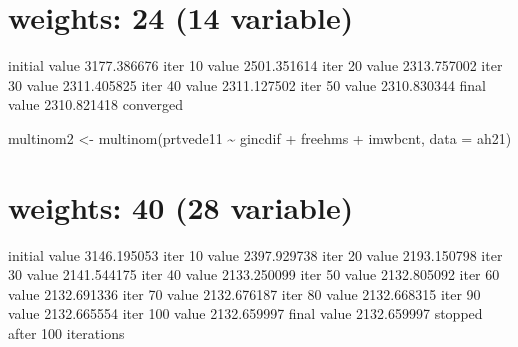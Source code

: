 \documentclass[
]{article}
\newenvironment{Shaded}{\begin{snugshade}}{\end{snugshade}}
\newcommand{\AttributeTok}[1]{\textcolor[rgb]{0.77,0.63,0.00}{#1}}
\newcommand{\CommentTok}[1]{\textcolor[rgb]{0.56,0.35,0.01}{\textit{#1}}}
\newcommand{\FunctionTok}[1]{\textcolor[rgb]{0.00,0.00,0.00}{#1}}
\newcommand{\NormalTok}[1]{#1}
\newcommand{\OtherTok}[1]{\textcolor[rgb]{0.56,0.35,0.01}{#1}}
\newcommand{\SpecialCharTok}[1]{\textcolor[rgb]{0.00,0.00,0.00}{#1}}
\newcommand{\StringTok}[1]{\textcolor[rgb]{0.31,0.60,0.02}{#1}}
\begin{document}
\begin{Shaded}
\end{Shaded}

\hypertarget{weights-24-14-variable}{%
\section{weights: 24 (14 variable)}\label{weights-24-14-variable}}

initial value 3177.386676 iter 10 value 2501.351614 iter 20 value
2313.757002 iter 30 value 2311.405825 iter 40 value 2311.127502 iter 50
value 2310.830344 final value 2310.821418 converged

\begin{Shaded}
\begin{Highlighting}[]
\NormalTok{multinom2 }\OtherTok{\textless{}{-}} \FunctionTok{multinom}\NormalTok{(prtvede11 }\SpecialCharTok{\textasciitilde{}}\NormalTok{ gincdif }\SpecialCharTok{+}\NormalTok{ freehms }\SpecialCharTok{+}\NormalTok{ imwbcnt,}
                      \AttributeTok{data =}\NormalTok{ ah21)}
\end{Highlighting}
\end{Shaded}

\hypertarget{weights-40-28-variable}{%
\section{weights: 40 (28 variable)}\label{weights-40-28-variable}}

initial value 3146.195053 iter 10 value 2397.929738 iter 20 value
2193.150798 iter 30 value 2141.544175 iter 40 value 2133.250099 iter 50
value 2132.805092 iter 60 value 2132.691336 iter 70 value 2132.676187
iter 80 value 2132.668315 iter 90 value 2132.665554 iter 100 value
2132.659997 final value 2132.659997 stopped after 100 iterations
\end{document}
